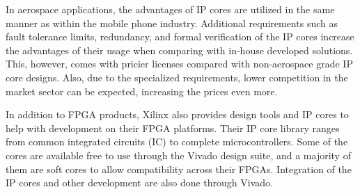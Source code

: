 \documentclass[12pt]{report}
\begin{document}
\par
In aerospace applications, the advantages of IP cores are utilized in the same manner as within the mobile phone industry. Additional requirements such as fault tolerance limits, redundancy, and formal verification of the IP cores increase the advantages of their usage when comparing with in-house developed solutions. This, however, comes with pricier licenses compared with non-aerospace grade IP core designs. Also, due to the specialized requirements, lower competition in the market sector can be expected, increasing the prices even more. \citep{DO254Cadence}
\par
In addition to FPGA products, Xilinx also provides design tools and IP cores to help with development on their FPGA platforms. Their IP core library ranges from common integrated circuits (IC) to complete microcontrollers. Some of the cores are available free to use through the Vivado design suite, and a majority of them are soft cores to allow compatibility across their FPGAs. Integration of the IP cores and other development are also done through Vivado. \citep{XilVivado}
\end{document}
